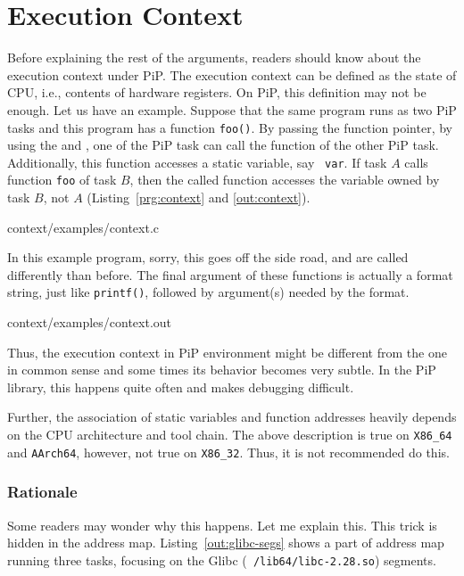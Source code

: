 
\section{Execution Context}\label{sec:context}

Before explaining the rest of the arguments, readers should know about
the execution context under PiP. The execution context can be defined
as the state of CPU, i.e., contents of hardware registers. On PiP,
this definition may not be enough. Let us have an example. Suppose
that the same program runs as two PiP tasks and this program has a
function {\tt foo()}. By passing the function pointer, by using the
 and , one of
the PiP task can call the function of the other PiP
task. Additionally, this function accesses a static variable, say {\tt
  var}. If task $A$ calls function {\tt foo} of task $B$, then the
called function accesses the variable owned by task $B$, not $A$
(Listing~\ref{prg:context} and \ref{out:context}).

 {context/examples/context.c}

In this example program, sorry, this goes off the side road,
 and 
 are called differently than
before. The final argument of these functions is actually a format
string, just like {\tt printf()}, followed by argument(s) needed by
the format. 


                {context/examples/context.out}

Thus, the execution context in PiP environment might be different from
the one in common sense and some times its behavior becomes very
subtle. In the PiP library, this happens quite often and makes
debugging difficult. 

Further, the association of static variables and function addresses
heavily depends on the CPU architecture and tool chain. The above
description is true on {\tt X86_64} and {\tt AArch64}, however, not
true on {\tt X86_32}. Thus, it is not recommended do this.

\subsubsection*{Rationale}

Some readers may wonder why this happens. Let me explain this. This
trick is hidden in the address map. Listing~\ref{out:glibc-segs} shows
a part of address map running three tasks, focusing on the Glibc ({\tt
  /lib64/libc-2.28.so}) segments. 

